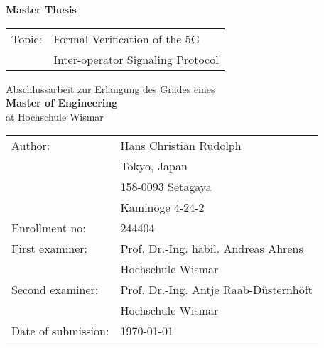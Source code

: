 \begin{titlepage}
\centering

\vspace*{3cm}

{
    \Huge{
        \textbf{Master Thesis}
    }
}

\vspace{2cm}

\begin{table}[h!]
\centering
\LARGE
\begin{tabular}{ll}
Topic:         & Formal Verification of the 5G\\
               & Inter-operator Signaling Protocol
\end{tabular}
\end{table}

\vspace{2cm}

\large{
    Abschlussarbeit zur Erlangung des Grades eines\\\vspace{2mm}
    \textbf{Master of Engineering}\\\vspace{2mm}
    at Hochschule Wismar
}

\vfill
{
    \renewcommand{\arraystretch}{1.1}
    {

    \begin{table}[h!]
    \centering
    \large
    \begin{tabular}{ll}
    Author:             & Hans Christian Rudolph               \\
                        & Tokyo, Japan                         \\
                        & 158-0093 Setagaya                    \\
                        & Kaminoge 4-24-2                      \\\vspace{3mm}
    Enrollment no:      & 244404                               \\
    First examiner:     & Prof. Dr.-Ing. habil. Andreas Ahrens \\
                        & Hochschule Wismar                    \\
    Second examiner:    & Prof. Dr.-Ing. Antje Raab-Düsternhöft\\\vspace{3mm}
                        & Hochschule Wismar                    \\
    Date of submission: & \today
    \end{tabular}
    \end{table}
    }
}

\vspace{2cm}

\end{titlepage}
